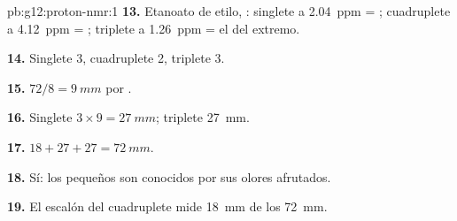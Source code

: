 \begin{solution}{pb:g12:proton-nmr:1}
\textbf{13.} Etanoato de etilo, : singlete a
\qty{2.04}{ppm} = ; cuadruplete a \qty{4.12}{ppm} = ;
triplete a \qty{1.26}{ppm} = el  del extremo.

\textbf{14.} Singlete 3, cuadruplete 2, triplete 3.

\textbf{15.} $72 / 8 = \qty{9}{mm}$ por .

\textbf{16.} Singlete $3 \times 9 = \qty{27}{mm}$; triplete
\qty{27}{mm}.

\textbf{17.} $18 + 27 + 27 = \qty{72}{mm}$.

\textbf{18.} Sí: los  pequeños son conocidos por sus olores afrutados.

\textbf{19.} El escalón del cuadruplete mide \qty{18}{mm} de los \qty{72}{mm}.
\end{solution}
